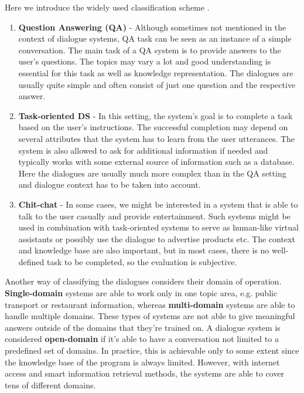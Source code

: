 Here we introduce the widely used classification scheme \cite{jurafsky2000speech}.
\begin{enumerate}
    \item \textbf{Question Answering (QA)} - Although sometimes not mentioned in the context of dialogue systems, QA task can be seen as an instance of a simple conversation. The main task of a QA system is to provide answers to the user's questions.
    The topics may vary a lot and good understanding is essential for this task as well as knowledge representation.
    The dialogues are usually quite simple and often consist of just one question and the respective answer.
    \item \textbf{Task-oriented DS} - In this setting, the system's goal is to complete a task based on the user's instructions.
    The successful completion may depend on several attributes that the system has to learn from the user utterances.
    The system is also allowed to ask for additional information if needed and typically works with some external source of information such as a database.
    Here the dialogues are usually much more complex than in the QA setting and dialogue context has to be taken into account.
    \item \textbf{Chit-chat} - In some cases, we might be interested in a system that is able to talk to the user casually and provide entertainment.
    Such systems might be used in combination with task-oriented systems to serve as human-like virtual assistants or possibly use the dialogue to advertise products etc.
    The context and knowledge base are also important, but in most cases, there is no well-defined task to be completed, so the evaluation is subjective.
\end{enumerate}

Another way of classifying the dialogues considers their domain of operation.
\textbf{Single-domain} systems are able to work only in one topic area, e.g. public transport or restaurant information, whereas \textbf{multi-domain} systems are able to handle multiple domains.
These types of systems are not able to give meaningful answers outside of the domains that they're trained on.
A dialogue system is considered \textbf{open-domain} if it's able to have a conversation not limited to a predefined set of domains.
In practice, this is achievable only to some extent since the knowledge base of the program is always limited.
However, with internet access and smart information retrieval methods, the systems are able to cover tens of different domains.

